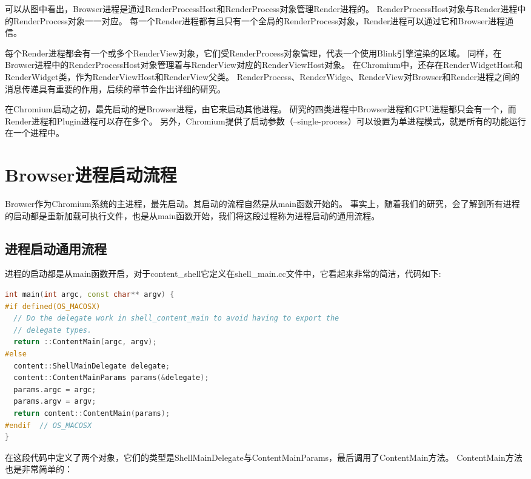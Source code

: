 可以从图中看出，Browser进程是通过RenderProcessHost和RenderProcess对象管理Render进程的。
RenderProcessHost对象与Render进程中的RenderProcess对象一一对应。
每一个Render进程都有且只有一个全局的RenderProcess对象，Render进程可以通过它和Browser进程通信。

每个Render进程都会有一个或多个RenderView对象，它们受RenderProcess对象管理，代表一个使用Blink引擎渲染的区域。
同样，在Browser进程中的RenderProcessHost对象管理着与RenderView对应的RenderViewHost对象。
在Chromium中，还存在RenderWidgetHost和RenderWidget类，作为RenderViewHost和RenderView父类。
RenderProcess、RenderWidge、RenderView对Browser和Render进程之间的消息传递具有重要的作用，后续的章节会作出详细的研究。

在Chromium启动之初，最先启动的是Browser进程，由它来启动其他进程。
研究的四类进程中Browser进程和GPU进程都只会有一个，而Render进程和Plugin进程可以存在多个。
另外，Chromium提供了启动参数（--single-process）可以设置为单进程模式，就是所有的功能运行在一个进程中。

\section{Browser进程启动流程}
Browser作为Chromium系统的主进程，最先启动。其启动的流程自然是从main函数开始的。
事实上，随着我们的研究，会了解到所有进程的启动都是重新加载可执行文件，也是从main函数开始，我们将这段过程称为进程启动的通用流程。

\subsection{进程启动通用流程}
进程的启动都是从main函数开启，对于content\_shell它定义在shell\_main.cc文件中，它看起来非常的简洁，代码如下:

\begin{spacing}{1.0}
\begin{lstlisting}[language={C++}]
int main(int argc, const char** argv) {
#if defined(OS_MACOSX)
  // Do the delegate work in shell_content_main to avoid having to export the
  // delegate types.
  return ::ContentMain(argc, argv);
#else
  content::ShellMainDelegate delegate;
  content::ContentMainParams params(&delegate);
  params.argc = argc;
  params.argv = argv;
  return content::ContentMain(params);
#endif  // OS_MACOSX
}
\end{lstlisting}
\end{spacing}

在这段代码中定义了两个对象，它们的类型是ShellMainDelegate与ContentMainParams，最后调用了ContentMain方法。
ContentMain方法也是非常简单的：

